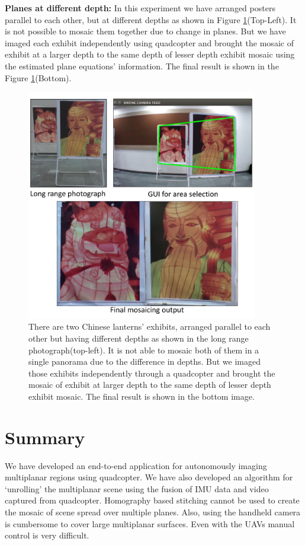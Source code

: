 \textbf{Planes at different depth:} In this experiment we have arranged posters
parallel to each other, but at different depths as shown in Figure
\ref{fig:resultFrontBack}(Top-Left). It is not possible to mosaic them together
due to change in planes. But we have imaged each exhibit independently using
quadcopter and brought the mosaic of exhibit at a larger depth to the same depth
of lesser depth exhibit mosaic using the estimated plane equations' information.
The final result is shown in the Figure \ref{fig:resultFrontBack}(Bottom).
\begin{figure}
\centering
\includegraphics[width=0.9\textwidth]{figures/multiplanar/frontback.pdf}
\caption[Result: Imaging at different depths]{There are two Chinese lanterns'
exhibits, arranged parallel to each other but having different depths as shown in the long range
photograph(top-left). It is not able to mosaic both of them in a single
panorama due to the difference in depths. But we imaged those exhibits
independently through a quadcopter and brought the mosaic of exhibit at larger
depth to the same depth of lesser depth exhibit mosaic. The final result is
shown in the bottom image.}
\label{fig:resultFrontBack}
\end{figure}

\section{Summary}
We have developed an end-to-end application for autonomously imaging multiplanar
regions using quadcopter. We have also developed an algorithm for `unrolling'
the multiplanar scene using the fusion of IMU data and video captured from
quadcopter. Homography based stitching cannot be used to create the mosaic of
scene spread over multiple planes. Also, using the handheld camera is cumbersome
to cover large multiplanar surfaces. Even with the UAVs manual control is very difficult.

